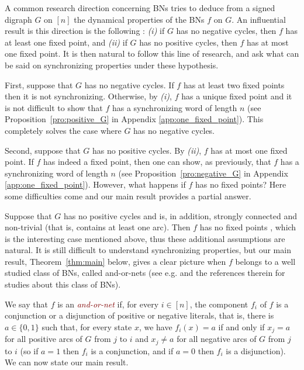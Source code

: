 \documentclass[11pt,letter]{article}
\newcommand{\EM}[1]{{\em\textcolor{Maroon}{#1}}}
\newcommand{\B}{\{0,1\}}
\begin{document}
\medskip
A common research direction concerning BNs tries to deduce from a signed digraph $G$ on $[n]$ the dynamical properties of the BNs $f$ on $G$. An influential result is this direction is the following \cite{A08}: {\em (i)} if $G$ has no negative cycles, then $f$ has at least one fixed point, and {\em (ii)} if $G$ has no positive cycles, then $f$ has at most one fixed point. It is then natural to follow this line of research, and ask what can be said on synchronizing properties under these hypothesis. 

\medskip
First, suppose that $G$ has no negative cycles. If $f$ has at least two fixed points then it is not synchronizing. Otherwise, by {\em (i)}, $f$ has a unique fixed point  and it is not difficult to show that $f$ has a synchronizing word of length $n$ (see Proposition~\ref{pro:positive_G} in Appendix \ref{app:one_fixed_point}). This completely solves the case where $G$ has no negative cycles. 

\medskip
Second, suppose that $G$ has no positive cycles. By {\em (ii)}, $f$ has at most one fixed point. If $f$ has indeed a fixed point, then one can show, as previously, that $f$ has a synchronizing word of length $n$ (see Proposition~\ref{pro:negative_G} in Appendix \ref{app:one_fixed_point}). However, what happens if $f$ has no fixed points? Here some difficulties come and our main result provides a partial answer. 

\medskip
Suppose that $G$ has no positive cycles and is, in addition, strongly connected and non-trivial (that is, contains at least one arc). Then $f$ has no fixed points \cite{A08}, which is the interesting case mentioned above, thus these additional assumptions are natural. It is still difficult to understand synchronizing properties, but our main result, Theorem~\ref{thm:main} below, gives a clear picture when $f$ belongs to a well studied class of BNs, called and-or-nets (see e.g. \cite{GH00,ADG04b,CLP2005,MTA10,VL12,RR13,VAL15,ARS17b} and the references therein for studies about this class of BNs). 

\medskip
We say that $f$ is an \EM{and-or-net} if, for every $i\in [n]$, the component $f_i$ of $f$ is a conjunction or a disjunction of positive or negative literals, that is, there is $a\in \B$ such that, for every state $x$, we have $f_i(x)=a$ if and only if $x_j=a$ for all positive arcs of $G$ from $j$ to $i$ and $x_j\neq a$ for all negative arcs of $G$ from $j$ to $i$ (so if $a=1$ then $f_i$ is a conjunction, and if $a=0$ then $f_i$ is a disjunction). We can now state our main result.
\end{document}
